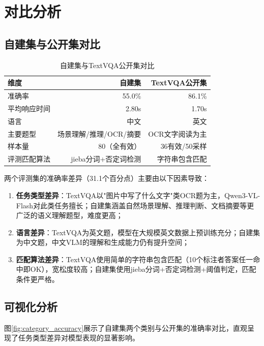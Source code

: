 \section{对比分析}

\subsection{自建集与公开集对比}

\begin{table}[htbp]
  \centering
  \caption{自建集与TextVQA公开集对比}
  \label{tab:comparison}
  \begin{tabular}{|l|r|r|}
    \hline
    \textbf{维度} & \textbf{自建集} & \textbf{TextVQA公开集} \\
    \hline
    准确率 & 55.0\% & 86.1\% \\
    平均响应时间 & 2.80s & 1.70s \\
    语言 & 中文 & 英文 \\
    主要题型 & 场景理解/推理/OCR/摘要 & OCR文字阅读为主 \\
    样本量 & 80（全有效） & 36有效/50采样 \\
    评测匹配算法 & jieba分词+否定词检测 & 字符串包含匹配 \\
    \hline
  \end{tabular}
\end{table}

两个评测集的准确率差异（31.1个百分点）主要由以下因素导致：

\begin{enumerate}
  \item \textbf{任务类型差异}：TextVQA以"图片中写了什么文字"类OCR题为主，Qwen3-VL-Flash对此类任务擅长；自建集涵盖自然场景理解、推理判断、文档摘要等更广泛的语义理解题型，难度更高；
  \item \textbf{语言差异}：TextVQA为英文题，模型在大规模英文数据上预训练充分；自建集为中文题，中文VLM的理解和生成能力仍有提升空间；
  \item \textbf{匹配算法差异}：TextVQA使用简单的字符串包含匹配（10个标注者答案任一命中即OK），宽松度较高；自建集使用jieba分词+否定词检测+阈值判定，匹配条件更严格。
\end{enumerate}

\subsection{可视化分析}

图\ref{fig:category_accuracy}展示了自建集两个类别与公开集的准确率对比，直观呈现了任务类型差异对模型表现的显著影响。

